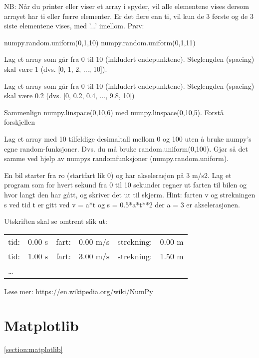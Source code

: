 NB: Når du printer eller viser et array i spyder, vil alle elementene vises dersom arrayet har ti eller færre elementer. Er det flere enn ti, vil kun de 3 første og de 3 siste elementene vises, med '...' imellom. Prøv:
\begin{usncodebox}
numpy.random.uniform(0,1,10)
numpy.random.uniform(0,1,11)
\end{usncodebox}

\begin{exercise}
Lag et array som går fra 0 til 10 (inkludert endepunktene). Steglengden (spacing) skal være 1  (dvs. [0, 1, 2, ..., 10]). 
\end{exercise}

\begin{exercise}
Lag et array som går fra 0 til 10 (inkludert endepunktene). Steglengden (spacing) skal være 0.2  (dvs. [0, 0.2, 0.4, ..., 9.8, 10])
\end{exercise}

\begin{exercise}
Sammenlign numpy.linspace(0,10,6) med numpy.linspace(0,10,5). Forstå forskjellen
\end{exercise}

\begin{exercise}
Lag et array med 10 tilfeldige desimaltall mellom 0 og 100 
uten å bruke numpy's egne random-funksjoner. 
Dvs. du må bruke random.uniform(0,100).
Gjør så det samme ved hjelp av numpys randomfunksjoner (numpy.random.uniform).
\end{exercise}

\begin{exercise}
En bil starter fra ro (startfart lik 0) og har akselerasjon på 3 m/s2. Lag et program som for hvert sekund fra 0 til 10 sekunder regner ut farten til bilen  og hvor langt den har gått, og skriver det ut til skjerm. Hint: farten v og strekningen s ved tid t er gitt ved v = a*t og s = 0.5*a*t**2 der a = 3 er akselerasjonen.

Utskriften skal se omtrent slik ut:
\begin{tabular}{l|r|l|r|l|r}
tid: & 0.00 s  &  fart: & 0.00 m/s &   strekning: &  0.00 m\\
tid: & 1.00 s  &  fart: & 3.00 m/s &   strekning: &  1.50 m\\
\ldots & & & & & 
\end{tabular}
\end{exercise}

Lese mer: https://en.wikipedia.org/wiki/NumPy

\section{Matplotlib}
\ref{section:matplotlib}

